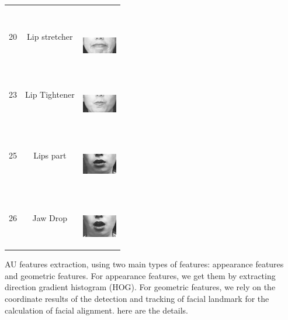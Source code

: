 \documentclass[10pt, conference, compsocconf]{IEEEtran}
\begin{document}
\begin{table}
\begin{tabular}{ccl}
\begin{minipage} {0.1\textwidth}
		\end{minipage}\\
		20 & Lip stretcher & \ \ \ \begin{minipage} {0.1\textwidth}   
			\includegraphics[width=0.6in]{AUimage/AU20.png}  
		\end{minipage}\\
		23 & Lip Tightener & \ \ \ \begin{minipage} {0.1\textwidth}   
			\includegraphics[width=0.6in]{AUimage/AU23.png}  
		\end{minipage}\\
		25 & Lips part & \ \ \ \begin{minipage} {0.1\textwidth}   
			\includegraphics[width=0.6in]{AUimage/AU25.png}  
		\end{minipage}\\
		26 & Jaw Drop & \ \ \ \begin{minipage} {0.1\textwidth}   
			\includegraphics[width=0.6in]{AUimage/AU26.png}  
		\end{minipage}\\
		\bottomrule
	\end{tabular}
\end{table}
AU features extraction, using two main types of features: appearance features and geometric features. For appearance features, we get them by extracting direction gradient histogram (HOG). For geometric features, we rely on the coordinate results of the detection and tracking of facial landmark for the calculation of facial alignment. here are the details.
\end{document}
